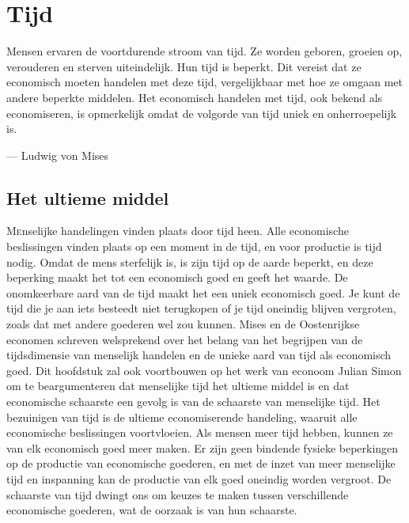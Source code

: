 \chapter{Tijd}

\begin{blockquotebox}
    Mensen ervaren de voortdurende stroom van tijd. Ze worden geboren, groeien op, verouderen en sterven uiteindelijk. Hun tijd is beperkt. Dit vereist dat ze economisch moeten handelen met deze tijd, vergelijkbaar met hoe ze omgaan met andere beperkte middelen. Het economisch handelen met tijd, ook bekend als economiseren, is opmerkelijk omdat de volgorde van tijd uniek en onherroepelijk is.\footnotemark
    \par\raggedleft--- Ludwig von Mises
\end{blockquotebox}

\section{Het ultieme middel}

\lettrine{M}enselijke handelingen vinden plaats door tijd heen. Alle economische beslissingen vinden plaats op een moment in de tijd, en voor productie is tijd nodig. Omdat de mens sterfelijk is, is zijn tijd op de aarde beperkt, en deze beperking maakt het tot een economisch goed en geeft het waarde. De onomkeerbare aard van de tijd maakt het een uniek economisch goed. Je kunt de tijd die je aan iets besteedt niet terugkopen of je tijd oneindig blijven vergroten, zoals dat met andere goederen wel zou kunnen. Mises en de Oostenrijkse economen schreven welsprekend over het belang van het begrijpen van de tijdsdimensie van menselijk handelen en de unieke aard van tijd als economisch goed. Dit hoofdstuk zal ook voortbouwen op het werk van econoom Julian Simon om te beargumenteren dat menselijke tijd het ultieme middel is en dat economische schaarste een gevolg is van de schaarste van menselijke tijd. Het bezuinigen van tijd is de ultieme economiserende handeling, waaruit alle economische beslissingen voortvloeien. Als mensen meer tijd hebben, kunnen ze van elk economisch goed meer maken.\autocite{25} Er zijn geen bindende fysieke beperkingen op de productie van economische goederen, en met de inzet van meer menselijke tijd en inspanning kan de productie van elk goed oneindig worden vergroot. De schaarste van tijd dwingt ons om keuzes te maken tussen verschillende economische goederen, wat de oorzaak is van hun schaarste.

